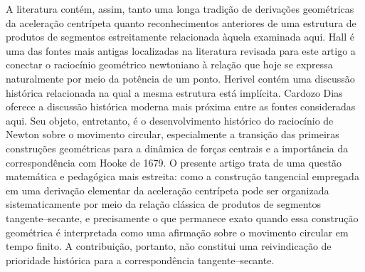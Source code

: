 \documentclass[12pt,a4paper]{article}
\numberwithin{equation}{section}
\theoremstyle{remark}
\begin{document}
A literatura contém, assim, tanto uma longa tradição de derivações geométricas da aceleração centrípeta quanto reconhecimentos anteriores de uma estrutura de produtos de segmentos estreitamente relacionada àquela examinada aqui. Hall \cite{Hall01031957} é uma das fontes mais antigas localizadas na literatura revisada para este artigo a conectar o raciocínio geométrico newtoniano à relação que hoje se expressa naturalmente por meio da potência de um ponto. Herivel \cite{herivel1965background} contém uma discussão histórica relacionada na qual a mesma estrutura está implícita. Cardozo Dias \cite{dias2023newton} oferece a discussão histórica moderna mais próxima entre as fontes consideradas aqui. Seu objeto, entretanto, é o desenvolvimento histórico do raciocínio de Newton sobre o movimento circular, especialmente a transição das primeiras construções geométricas para a dinâmica de forças centrais e a importância da correspondência com Hooke de 1679. O presente artigo trata de uma questão matemática e pedagógica mais estreita: como a construção tangencial empregada em uma derivação elementar da aceleração centrípeta pode ser organizada sistematicamente por meio da relação clássica de produtos de segmentos tangente--secante, e precisamente o que permanece exato quando essa construção geométrica é interpretada como uma afirmação sobre o movimento circular em tempo finito. A contribuição, portanto, não constitui uma reivindicação de prioridade histórica para a correspondência tangente--secante.
\end{document}
